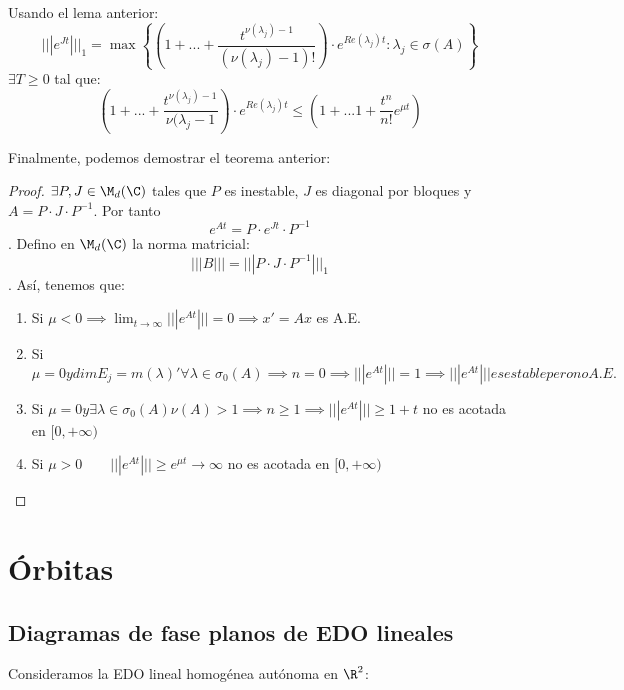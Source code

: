 Usando el lema anterior:
\begin{equation}
|||e^{Jt}|||_1=\max
\left\{ {\left(
1+...+\frac{t^{\nu(\lambda_j)-1}}{(\nu (\lambda_j)-1)!}
\right) }
\cdot e^{Re(\lambda_j)t} : \lambda_j \in \sigma(A) \right\}
\tag{cosarara}\label{cosarara}
\end{equation}
$\exists T \geq 0$ tal que:
\begin{equation}
(1+...+\frac{t^{\nu(\lambda_j)-1}}{\nu(\lambda_j - 1})\cdot e^{Re(\lambda_j)t} \leq (1+...1+\frac{t^n}{n!}e^{\mu t})
\end{equation}

Finalmente, podemos demostrar el teorema anterior:

\begin{proof}
$\exists P, J \in \M_d(\C)$ tales que $P$ es inestable, $J$ es diagonal por bloques y $A=P\cdot J \cdot P^{-1}$. Por tanto $$e^{At}=P\cdot e^{Jt} \cdot P^{-1}$$.
Defino en $\M_d(\C)$ la norma matricial:
$$|||B|||=|||P\cdot J \cdot P^{-1}|||_1$$.
Así, tenemos que:
\begin{enumerate}
\item Si $\mu < 0 \implies \lim_{t\to\infty}|||e^{At}|||=0\implies x'=Ax$ es A.E.
\item Si $\mu = 0 y dimE_j=m(\lambda)' \forall \lambda \in \sigma_0(A)\implies n=0 \implies |||e^{At}|||=1\implies|||e^{At}||| es estable pero no A.E.$
\item Si $\mu = 0 y \exists \lambda \in \sigma_0(A) \nu(A)>1 \implies n\geq 1\implies |||e^{At}|||\geq 1+t$ no es acotada en $[0,+\infty)$
\item Si $\mu > 0 \qquad |||e^{At}|||\geq e^{\mu t}\to \infty$ no es acotada en $[0,+\infty)$
\end{enumerate}
\end{proof}


\section{Órbitas}
\subsection{Diagramas de fase planos de EDO lineales}

Consideramos la EDO lineal homogénea autónoma en $\R^2$:

